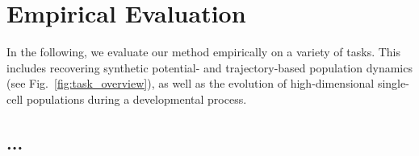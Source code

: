 \begin{table}[t]
    \caption{Evaluation of predictive performance w.r.t. the entropy-regularized Wasserstein distance $W_\varepsilon$ \eqref{eq:reg-ot} of \textsc{JKOnet} and the forward method on the embryoid body scRNA-seq data per time step (using 3 runs).}
    \label{tab:exp_jkonet_cell_pred}
    \centering
{}
\end{table}

\section{Empirical Evaluation} \label{sec:evaluation}
In the following, we evaluate our method empirically on a variety of tasks. This includes recovering synthetic potential- and trajectory-based population dynamics (see Fig.~\ref{fig:task_overview}), as well as the evolution of high-dimensional single-cell populations during a developmental process. 

\subsection{...} \label{sec:eval_synt}

